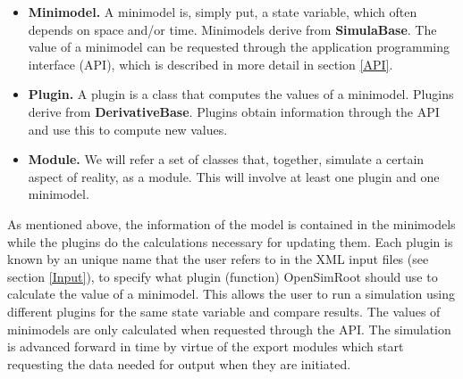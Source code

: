 \documentclass{article}
\begin{document}
\begin{itemize}
\item \textbf{Minimodel.} A minimodel is, simply put, a state variable, which often depends on space and/or time. Minimodels derive from \textbf{SimulaBase}. The value of a minimodel can be requested through the application programming interface (API), which is described in more detail in section \ref{API}.
\item \textbf{Plugin.} A plugin is a class that computes the values of a minimodel. Plugins derive from \textbf{DerivativeBase}. Plugins obtain information through the API and use this to compute new values.
\item \textbf{Module.} We will refer a set of classes that, together, simulate a certain aspect of reality, as a module. This will involve at least one plugin and one minimodel.
\end{itemize}

\noindent As mentioned above, the information of the model is contained in the minimodels while the plugins do the calculations necessary for updating them. Each plugin is known by an unique name that the user refers to in the XML input files (see section \ref{Input}), to specify what plugin (function) OpenSimRoot should use to calculate the value of a minimodel. This allows the user to run a simulation using different plugins for the same state variable and compare results. The values of minimodels are only calculated when requested through the API. The simulation is advanced forward in time by virtue of the export modules which start requesting the data needed for output when they are initiated. \newline
\end{document}
